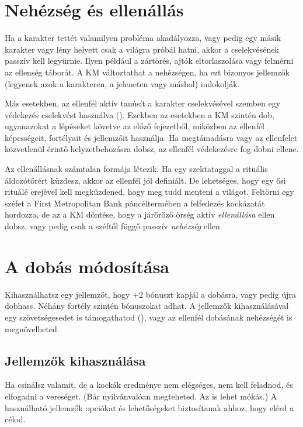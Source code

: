 \label{Nehézség és ellenállás}
\section{Nehézség és ellenállás}

Ha a karakter tettét valamilyen probléma akadályozza, vagy pedig egy másik karakter vagy lény helyett csak a világra próbál hatni, akkor a cselekvésének passzív  kell legyűrnie. Ilyen például a zártörés, ajtók eltorlaszolása vagy felmérni az ellenség táborát. A KM változtathat a nehézségen, ha ezt bizonyos jellemzők (legyenek azok a karakteren, a jeleneten vagy máshol) indokolják.

Más esetekben, az ellenfél aktív  tanúsít a karakter cselekvésével szemben egy védekezés cselekvést használva (). Ezekben az esetekben a KM szintén dob, ugyanazokat a lépéseket követve az előző fejezetből, miközben az ellenfél képességeit, fortélyait és jellemzőit használja. Ha megtámadásra vagy az ellenfelet közvetlenül érintő helyzetbehozásra dobsz, az ellenfél védekezésre fog dobni ellene.

Az ellenállásnak számtalan formája létezik. Ha egy szektataggal a rituális áldozótőrért küzdesz, akkor az ellenfél jól definiált. De lehetséges, hogy egy ősi rituálé erejével kell megküzdened, hogy meg tudd menteni a világot. Feltörni egy széfet a First Metropolitan Bank páncéltermében a felfedezés kockázatát hordozza, de az a KM döntése, hogy a járőröző őrség aktív \emph{ellenállása} ellen dobsz, vagy pedig csak a széftől függő passzív \emph{nehézség} ellen.

\section{A dobás módosítása}

Kihasználhatsz egy jellemzőt, hogy +2 bónuszt kapjál a dobásra, vagy pedig újra dobhass. Néhány fortély szintén bónuszokat adhat. A jellemzők kihasználásával egy szövetségesedet is támogathatod (), vagy az ellenfél dobásának nehézségét is megnövelheted.

\label{Jellemzők kihasználása}
\subsection{Jellemzők kihasználása}

Ha csinálsz valamit, de a kockák eredménye nem elégséges, nem kell feladnod, és elfogadni a vereséget. (Bár nyilvánvalóan megteheted. Az is lehet mókás.) A használható jellemzők opciókat és lehetőségeket biztosítanak ahhoz, hogy elérd a célod.

